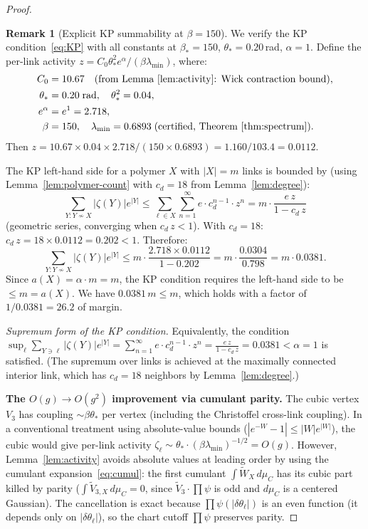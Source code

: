\documentclass[11pt]{article}
\theoremstyle{definition}
\newtheorem{remark}[theorem]{Remark}
\begin{document}
\begin{proof}
\begin{remark}[Explicit KP summability at $\beta=150$]%
\label{rem:KP-explicit}
We verify the KP condition~\eqref{eq:KP} with all constants
at $\beta_*=150$, $\theta_*=0.20$\,rad, $\alpha=1$.
Define the per-link activity
$z=C_0\theta_*^2 e^\alpha/(\beta\lambda_{\min})$, where:
\begin{align*}
C_0&=10.67\quad\text{(from Lemma~\ref{lem:activity}: Wick
contraction bound)},\\
\theta_*&=0.20\;\text{rad},\quad\theta_*^2=0.04,\\
e^\alpha&=e^1=2.718,\\
\beta&=150,\quad\lambda_{\min}=0.6893\;\text{(certified,
Theorem~\ref{thm:spectrum})}.
\end{align*}
Then $z=10.67\times 0.04\times 2.718/(150\times 0.6893)
=1.160/103.4=0.0112$.

The KP left-hand side for a polymer $X$ with $|X|=m$ links
is bounded by (using Lemma~\ref{lem:polymer-count} with
$c_d=18$ from Lemma~\ref{lem:degree}):
\begin{equation}\label{eq:KP-explicit}
\sum_{Y:Y\not\sim X}|\zeta(Y)|e^{|Y|}
\le\sum_{\ell\in X}\sum_{n=1}^\infty e\cdot c_d^{n-1}\cdot z^n
=m\cdot\frac{e\,z}{1-c_d\,z}
\end{equation}
(geometric series, converging when $c_d\,z<1$).
With $c_d=18$: $c_d\,z=18\times 0.0112=0.202<1$.
Therefore:
\[
\sum_{Y:Y\not\sim X}|\zeta(Y)|e^{|Y|}
\le m\cdot\frac{2.718\times 0.0112}{1-0.202}
=m\cdot\frac{0.0304}{0.798}
=m\cdot 0.0381.
\]
Since $a(X)=\alpha\cdot m=m$, the KP condition requires the
left-hand side to be $\le m=a(X)$.  We have $0.0381\,m\le m$,
which holds with a factor of $1/0.0381=26.2$ of margin.

\emph{Supremum form of the KP condition.}
Equivalently, the condition
$\sup_\ell\sum_{Y\ni\ell}|\zeta(Y)|e^{|Y|}
=\sum_{n=1}^\infty e\cdot c_d^{n-1}\cdot z^n
=\frac{e\,z}{1-c_d\,z}=0.0381<\alpha=1$
is satisfied.  (The supremum over links is achieved at
the maximally connected interior link, which has
$c_d=18$ neighbors by Lemma~\ref{lem:degree}.)
\end{remark}

\textbf{The $O(g){\to}O(g^2)$ improvement via cumulant parity.}
The cubic vertex $V_3$ has coupling $\sim\beta\theta_*$ per vertex
(including the Christoffel cross-link coupling).  In a conventional
treatment using absolute-value bounds ($|e^{-W}-1|\le|W|e^{|W|}$),
the cubic would give per-link activity
$\zeta_\ell\sim\theta_*\cdot(\beta\lambda_{\min})^{-1/2}=O(g)$.
However, Lemma~\ref{lem:activity} avoids absolute values at leading
order by using the cumulant expansion~\eqref{eq:cumul}: the first
cumulant $\int\widetilde{W}_X\,d\mu_C$ has its cubic part killed by
parity ($\int\widetilde{V}_{3,X}\,d\mu_C=0$, since
$\widetilde{V}_3\cdot\prod\psi$ is odd and $d\mu_C$ is a centered
Gaussian).  The cancellation is exact because $\prod\psi(|\delta\theta_\ell|)$
is an even function (it depends only on $|\delta\theta_\ell|$), so the
chart cutoff $\prod\psi$ preserves parity.


\end{proof}
\end{document}
